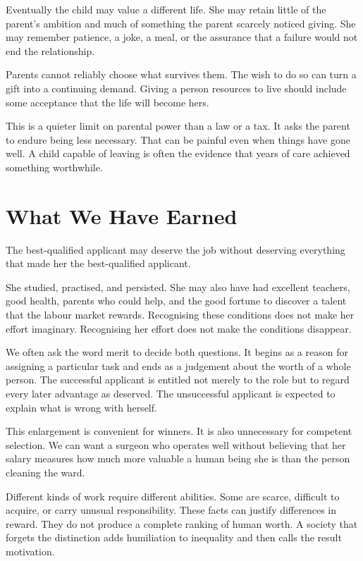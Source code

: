 \documentclass[12pt,a4paper]{book}
\begin{document}
Eventually the child may value a different life. She may retain little of the parent's ambition and much of something the parent scarcely noticed giving. She may remember patience, a joke, a meal, or the assurance that a failure would not end the relationship.

Parents cannot reliably choose what survives them. The wish to do so can turn a gift into a continuing demand. Giving a person resources to live should include some acceptance that the life will become hers.

This is a quieter limit on parental power than a law or a tax. It asks the parent to endure being less necessary. That can be painful even when things have gone well. A child capable of leaving is often the evidence that years of care achieved something worthwhile.

\chapter{What We Have Earned}

The best-qualified applicant may deserve the job without deserving everything that made her the best-qualified applicant.

She studied, practised, and persisted. She may also have had excellent teachers, good health, parents who could help, and the good fortune to discover a talent that the labour market rewards. Recognising these conditions does not make her effort imaginary. Recognising her effort does not make the conditions disappear.

We often ask the word merit to decide both questions. It begins as a reason for assigning a particular task and ends as a judgement about the worth of a whole person. The successful applicant is entitled not merely to the role but to regard every later advantage as deserved. The unsuccessful applicant is expected to explain what is wrong with herself.

This enlargement is convenient for winners. It is also unnecessary for competent selection. We can want a surgeon who operates well without believing that her salary measures how much more valuable a human being she is than the person cleaning the ward.

Different kinds of work require different abilities. Some are scarce, difficult to acquire, or carry unusual responsibility. These facts can justify differences in reward. They do not produce a complete ranking of human worth. A society that forgets the distinction adds humiliation to inequality and then calls the result motivation.
\end{document}
